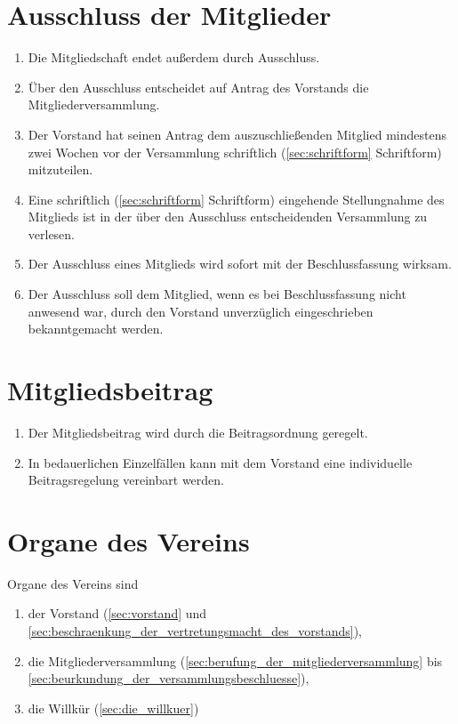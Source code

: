 \documentclass[a4paper]{article}
\begin{document}
\section{Ausschluss der Mitglieder}\label{sec:ausschluss_der_mitglieder}

\begin{enumerate}
\item Die Mitgliedschaft endet außerdem durch Ausschluss.
\item Über den Ausschluss entscheidet auf Antrag des Vorstands die Mitgliederversammlung.
\item Der Vorstand hat seinen Antrag dem auszuschließenden Mitglied mindestens zwei Wochen vor der Versammlung schriftlich (\ref{sec:schriftform} Schriftform) mitzuteilen.
\item Eine schriftlich (\ref{sec:schriftform} Schriftform) eingehende Stellungnahme des Mitglieds ist in der über den Ausschluss entscheidenden Versammlung zu verlesen.
\item Der Ausschluss eines Mitglieds wird sofort mit der Beschlussfassung wirksam.
\item Der Ausschluss soll dem Mitglied, wenn es bei Beschlussfassung nicht anwesend war, durch den Vorstand unverzüglich eingeschrieben bekanntgemacht werden.
\end{enumerate}


\section{Mitgliedsbeitrag}\label{sec:mitgliedsbeitrag}

\begin{enumerate}
\item Der Mitgliedsbeitrag wird durch die Beitragsordnung geregelt.
\item In bedauerlichen Einzelfällen kann mit dem Vorstand eine individuelle Beitragsregelung vereinbart werden.
\end{enumerate}


\section{Organe des Vereins}\label{sec:organe_des_vereins}

Organe des Vereins sind
\begin{enumerate}
\item der Vorstand (\ref{sec:vorstand} und \ref{sec:beschraenkung_der_vertretungsmacht_des_vorstands}),
\item die Mitgliederversammlung (\ref{sec:berufung_der_mitgliederversammlung} bis \ref{sec:beurkundung_der_versammlungsbeschluesse}),
\item die Willkür (\ref{sec:die_willkuer})
\end{enumerate}
\end{document}
